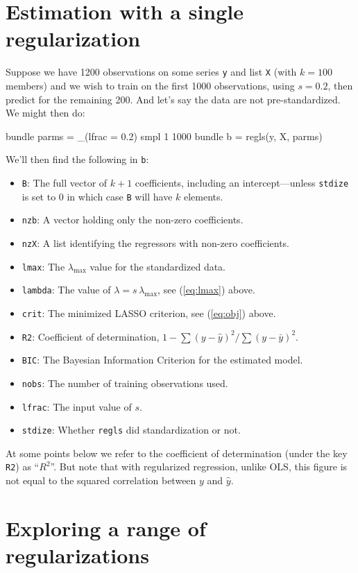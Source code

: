 \documentclass{article}
\begin{document}
\section{Estimation with a single regularization}
\label{sec:single-lambda}

Suppose we have 1200 observations on some series \texttt{y} and list
\texttt{X} (with $k=100$ members) and we wish to train on the first
1000 observations, using $s = 0.2$, then predict for the remaining
200. And let's say the data are not pre-standardized. We might then
do:
\begin{code}
bundle parms = _(lfrac = 0.2)
smpl 1 1000
bundle b = regls(y, X, parms)
\end{code}
We'll then find the following in \texttt{b}:
\begin{itemize}
\item \texttt{B}: The full vector of $k+1$ coefficients, including an
  intercept---unless \texttt{stdize} is set to 0 in which case
  \texttt{B} will have $k$ elements.
\item \texttt{nzb}: A vector holding only the non-zero coefficients.
\item \texttt{nzX}: A list identifying the regressors with non-zero
  coefficients.
\item \texttt{lmax}: The $\lambda_{\max}$ value for the standardized
  data.
\item \texttt{lambda}: The value of $\lambda = s\,\lambda_{\max}$, see
  (\ref{eq:lmax}) above.
\item \texttt{crit}: The minimized LASSO criterion, see (\ref{eq:obj})
  above.
\item \texttt{R2}: Coefficient of determination,
  $1 - \sum(y-\hat{y})^2/\sum(y-\bar{y})^2$.
\item \texttt{BIC}: The Bayesian Information Criterion for the
  estimated model.
\item \texttt{nobs}: The number of training observations used.
\item \texttt{lfrac}: The input value of $s$.
\item \texttt{stdize}: Whether \texttt{regls} did standardization or
  not.
\end{itemize}

At some points below we refer to the coefficient of determination
(under the key \texttt{R2}) as ``$R^2$''. But note that with
regularized regression, unlike OLS, this figure is not equal to the
squared correlation between $y$ and $\hat{y}$.

\section{Exploring a range of regularizations}
\label{sec:simple-search}
\end{document}
